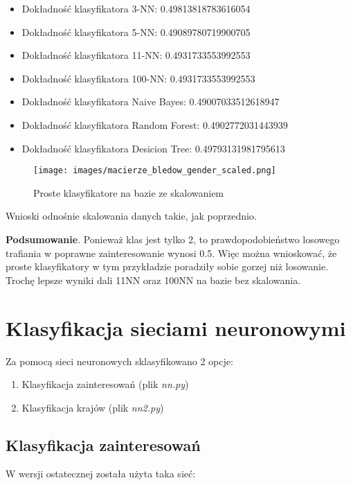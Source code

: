 \documentclass[12pt,a4paper]{article}
\begin{document}
\begin{itemize}
    \item Dokładność klasyfikatora 3-NN: 0.49813818783616054
    \item Dokładność klasyfikatora 5-NN: 0.49089780719900705
    \item Dokładność klasyfikatora 11-NN: 0.4931733553992553
    \item Dokładność klasyfikatora 100-NN: 0.4931733553992553
    \item Dokładność klasyfikatora Naive Bayes: 0.49007033512618947
    \item Dokładność klasyfikatora Random Forest: 0.4902772031443939
    \item Dokładność klasyfikatora Desicion Tree: 0.49793131981795613
\end{itemize}

\begin{figure}[h]
    \centering
    \texttt{[image: images/macierze\_bledow\_gender\_scaled.png]}
    \caption{Proste klasyfikatore na bazie ze skalowaniem}
    \label{fig:pk3}
\end{figure}

Wnioski odnośnie skalowania danych takie, jak poprzednio.

\textbf{Podsumowanie}. Ponieważ klas jest tylko 2, to prawdopodobieństwo losowego trafiania w poprawne zainteresowanie wynosi 0.5. Więc można wnioskować, że proste klasyfikatory w tym przykładzie poradziły sobie gorzej niż losowanie. Trochę lepsze wyniki dali 11NN oraz 100NN na bazie bez skalowania.

\newpage

\section{Klasyfikacja sieciami neuronowymi}

Za pomocą sieci neuronowych sklasyfikowano 2 opcje:

\begin{enumerate}
    \item Klasyfikacja zainteresowań (plik \textit{nn.py})
    \item Klasyfikacja krajów (plik \textit{nn2.py})
\end{enumerate}

\subsection{Klasyfikacja zainteresowań}
W wersji ostatecznej została użyta taka sieć:
\end{document}
